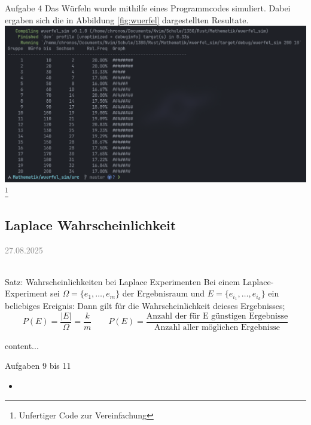 \documentclass[11pt,a4paper,oneside]{article}
\newcommand{\lessondate}[1]{
	\noindent\hfill\textcolor{gray}{\textsc{#1}} \\
	\vspace{0.5cm}
}
\begin{document}
	\begin{loesung}{Aufgabe 4}
		Das Würfeln wurde mithilfe eines Programmcodes simuliert. 
		Dabei ergaben sich die in Abbildung \ref{fig:wuerfel} dargestellten Resultate.
			\centering
			\includegraphics[width=\textwidth]{wuerfel.png}
			\label{fig:wuerfel}
		\footnote{Unfertiger Code zur Vereinfachung}
	\end{loesung}
	
	\newpage
	
	\subsection{Laplace Wahrscheinlichkeit}
	
	\lessondate{27.08.2025}\\
	
	\begin{theo}{Satz: Wahrscheinlichkeiten bei Laplace Experimenten}
		Bei einem Laplace-Experiment sei \(\Omega = \{e_{1}, \dots, e_{m}\}\) der Ergebnisraum und \(E = \{e_{i_1}, \dots, e_{i_k}\}
		\) ein beliebiges Ereignis: Dann gilt für die Wahrscheinlichkeit deieses Ergebnisses; 
		\[
		P(E) =  \frac{|E|}{\Omega} =  \frac{k}{m} \qquad P(E) = \frac{\text{Anzahl der für E günstigen Ergebnisse}}{\text{Anzahl aller möglichen Ergebnisse}}
		\] 
	\end{theo}
	
	\begin{exem}
		content...
	\end{exem}
	
	\begin{aufgabe}{Aufgaben 9 bis 11}
		\begin{itemize}
			\item 
		\end{itemize}
	\end{aufgabe}
	
\end{document}
